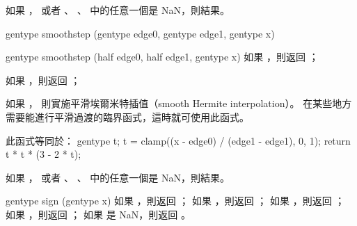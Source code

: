 如果 ，
或者 、 、  中的任意一個是 NaN，則結果。
\stopbuffer

gentype smoothstep (gentype edge0,
		gentype edge1,
		gentype x)

gentype smoothstep (half edge0,
		half edge1,
		gentype x)
\stopbuffer
{}
如果 ，則返回 ；

如果 ，則返回 ；

如果 ，
則實施平滑埃爾米特插值（smooth Hermite interpolation）。
在某些地方需要能進行平滑過渡的臨界函式，這時就可使用此函式。

此函式等同於：
\startcintbl
gentype t;
t = clamp((x - edge0) / (edge1 - edge1), 0, 1);
return t * t * (3 - 2 * t);
\stopcintbl

如果 ，
或者 、 、  中的任意一個是 NaN，則結果。
\stopbuffer

gentype sign (gentype x)
\stopbuffer
{}
如果 ，則返回 ；
如果 ，則返回 ；
如果 ，則返回 ；
如果 ，則返回 ；
如果  是 NaN，則返回 。
\stopbuffer

